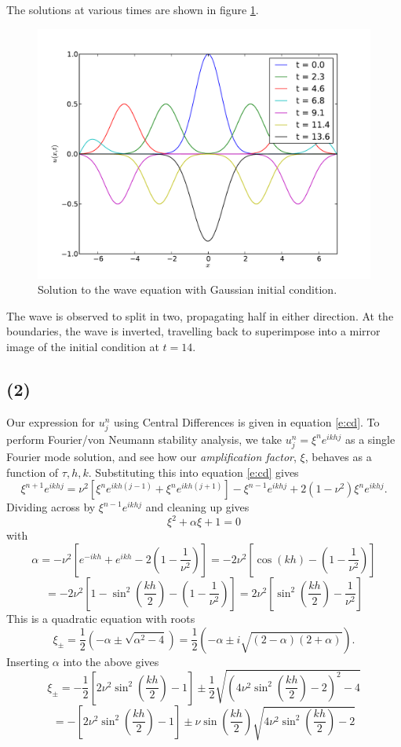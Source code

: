 \documentclass[10pt]{article}
\newcommand{\ujn}{u_{j}^{n}}
\newcommand{\eihjk}{e^{ikhj}}
\newcommand{\eihjpk}{e^{ikh(j+1)}}
\newcommand{\eihjmk}{e^{ikh(j-1)}}
\begin{document}
The solutions at various times are shown in figure \ref{f:dirichlet}.
\begin{figure}
  \centering
  \includegraphics[width=\textwidth]{1/dirichlet.pdf}
  \caption{Solution to the wave equation with Gaussian initial condition.}
  \label{f:dirichlet}
\end{figure}
The wave is observed to split in two, propagating half in either direction.
At the boundaries, the wave is inverted, travelling back to superimpose into
a mirror image of the initial condition at $t=14$.

\subsection*{(2)}
Our expression for $\ujn$ using Central Differences is given in equation \ref{e:cd}.
To perform Fourier/von Neumann stability analysis, we take $\ujn = \xi^n \eihjk$ as
a single Fourier mode solution, and see how our {\it amplification factor}, $\xi$,
behaves as a function of $\tau,h,k$.
Substituting this into equation \ref{e:cd} gives
$$
\xi^{n+1} \eihjk= \nu^2 \left[ \xi^n \eihjmk + \xi^n \eihjpk \right] - \xi^{n-1} \eihjk +
2(1 - \nu^2) \xi^n \eihjk.
$$
Dividing across by $\xi^{n-1} \eihjk$ and cleaning up gives
\begin{equation}
\xi^2 + \alpha \xi + 1 = 0
\label{e:quad}
\end{equation}
with
$$\alpha = -\nu^2 \left[ e^{-ikh} + e^{ikh} - 2\left(1 - \frac{1}{\nu^2}\right) \right]
= -2 \nu^2 \left[ \cos(kh) - \left(1 - \frac{1}{\nu^2}\right) \right] $$
$$= -2 \nu^2 \left[ 1 - \sin^2\left(\frac{kh}{2}\right) - \left(1 - \frac{1}{\nu^2}\right) \right]
=  2 \nu^2 \left[ \sin^2\left(\frac{kh}{2}\right) - \frac{1}{\nu^2} \right] $$
This is a quadratic equation with roots
$$
\xi_\pm = \frac{1}{2} \left( -\alpha \pm \sqrt{\alpha^2 - 4} \right) =
\frac{1}{2} \left( -\alpha \pm i\sqrt{(2 - \alpha)(2+\alpha)}\right).
$$
Inserting $\alpha$ into the above gives
$$ \xi_\pm = -\frac{1}{2}\left[2\nu^2 \sin^2\left(\frac{kh}{2}\right) -1 \right]
\pm \frac{1}{2}\sqrt{\left(4\nu^2\sin^2\left(\frac{kh}{2}\right) -2\right)^2 - 4}
$$
$$ = -\left[2\nu^2 \sin^2\left(\frac{kh}{2}\right) -1 \right]
\pm \nu\sin\left(\frac{kh}{2}\right)\sqrt{4\nu^2\sin^2\left(\frac{kh}{2}\right) -2}
$$
\end{document}
